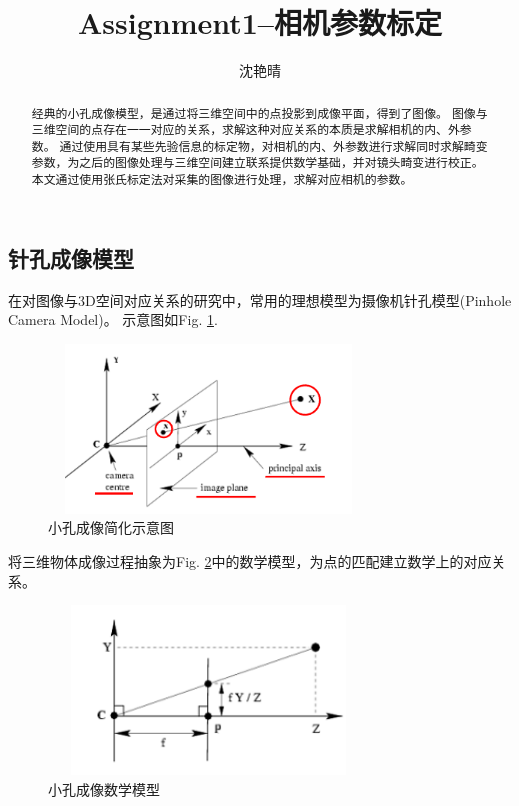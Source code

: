 \documentclass[UTF8]{ctexart}
\author{沈艳晴}
\title{Assignment1--相机参数标定}
\begin{document}
\begin{CJK*}{UTF8}{gbsn}
\CJKindent%
\maketitle


\begin{abstract}
经典的小孔成像模型，是通过将三维空间中的点投影到成像平面，得到了图像。
图像与三维空间的点存在一一对应的关系，求解这种对应关系的本质是求解相机的内、外参数。
通过使用具有某些先验信息的标定物，对相机的内、外参数进行求解同时求解畸变参数，为之后的图像处理与三维空间建立联系提供数学基础，并对镜头畸变进行校正。
本文通过使用张氏标定法对采集的图像进行处理，求解对应相机的参数。
\end{abstract}

\section{针孔成像模型}

在对图像与3D空间对应关系的研究中，常用的理想模型为摄像机针孔模型(Pinhole Camera Model)。
示意图如Fig. \ref{fig:camera1}.
\begin{figure}[htbp]
    \centering
    \includegraphics[height=4.5cm,width=8.5cm]{1.png}
    \caption{小孔成像简化示意图}
    \label{fig:camera1}
\end{figure}

将三维物体成像过程抽象为Fig. \ref{fig:camera2}中的数学模型，为点的匹配建立数学上的对应关系。
\begin{figure}[htbp]
    \centering
    \includegraphics[height=4.5cm,width=8.5cm]{2.png}
    \caption{小孔成像数学模型}
    \label{fig:camera2}
\end{figure}


\end{CJK*}
\end{document}
